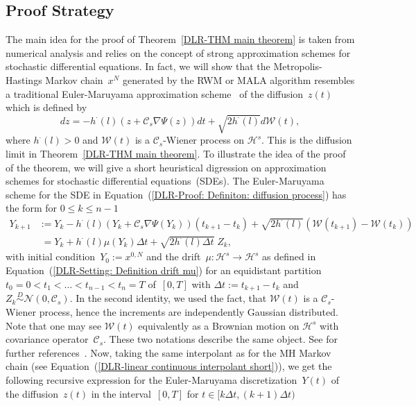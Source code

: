 \subsection{Proof Strategy}
\label{sec:sub:DLR-Proof strategy}


The main idea for the proof of Theorem~\ref{DLR-THM main theorem} is taken from numerical analysis and relies on the concept of strong approximation schemes for stochastic differential equations. In fact, we will show that the Metropolis-Hastings Markov chain~$x^N$ generated by the RWM or MALA algorithm resembles a traditional Euler-Maruyama approximation scheme~\autocite{Kloeden1992} of the diffusion~$z(t)$ which is defined by
 \begin{equation}
 \label{DLR-Proof: Definiton: diffusion process}
  dz = -h^{\cdot}(l) (z + \mathcal{C}_s \nabla \Psi(z)) dt + \sqrt{2 h^{\cdot}(l)} d\mathcal{W}(t),
 \end{equation}
where $h^{\cdot}(l) > 0$ and $\mathcal{W}(t)$ is a $\mathcal{C}_s$-Wiener process on $\mathcal{H}^s$. This is the diffusion limit in Theorem~\ref{DLR-THM main theorem}. To illustrate the idea of the proof of the theorem, we will give a short heuristical digression on approximation schemes for stochastic differential equations~(SDEs). The Euler-Maruyama scheme for the SDE in Equation~(\ref{DLR-Proof: Definiton: diffusion process}) has the form for $0 \leq k \leq n-1$
\begin{equation}
\label{DLR-Proof: Definition Euler-Maruyama scheme of limit SDE}
\begin{split}
  Y_{k+1} & := Y_k - h^{\cdot}(l) (Y_k + \mathcal{C}_s \nabla \Psi(Y_k)) (t_{k+1} - t_k) + \sqrt{2 h^{\cdot}(l)} (\mathcal{W}(t_{k+1}) - \mathcal{W}({t_k})) \\
  & \; = Y_k + h^{\cdot}(l) \mu(Y_k) \Delta t + \sqrt{2 h^{\cdot}(l) \Delta t} \; Z_k,
\end{split}
\end{equation}
with initial condition~$Y_0 := x^{0,N}$ and the drift~$\mu: \mathcal{H}^s \to \mathcal{H}^s$ as defined in Equation~(\ref{DLR-Setting: Definition drift mu}) for an equidistant partition~$t_0 =0 < t_1 < \dots < t_{n-1} < t_n = T $ of~$[0,T]$ with $\Delta t := t_{k+1} - t_k$ and $Z_k \stackrel{D}{\sim} \mathcal{N}(0, \mathcal{C}_s)$. In the second identity, we used the fact, that $\mathcal{W}(t)$ is a $\mathcal{C}_s$-Wiener process, hence the increments are independently Gaussian distributed. Note that one may see $\mathcal{W}(t)$ equivalently as a Brownian motion on $\mathcal{H}^s$ with covariance operator~$\mathcal{C}_s$. These two notations describe the same object. See for further references~\autocite{DaPrato1992, DaPrato2002}. Now, taking the same interpolant as for the MH Markov chain (see Equation~(\ref{DLR-linear continuous interpolant short})), we get the following recursive expression for the Euler-Maruyama discretization~$Y(t)$ of the diffusion~$z(t)$ in the interval~$[0,T]$ for $t \in [k \Delta t, (k+1) \Delta t)$
